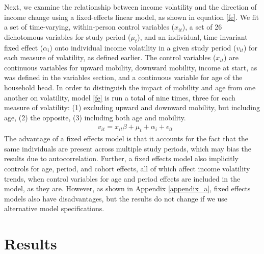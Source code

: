 \documentclass[12pt]{article}
\begin{document}
Next, we examine the relationship between income volatility and the direction of income change using a fixed-effects linear model, as shown in equation \ref{fe}. We fit a set of time-varying, within-person control variables ($x_{it}$), a set of 26 dichotomous variables for study period ($\mu_{t}$), and an individual, time invariant fixed effect ($\alpha_{i}$) onto individual income volatility in a given study period ($v_{it}$) for each measure of volatility, as defined earlier. The control variables ($x_{it}$) are continuous variables for upward mobility, downward mobility, income at start, as was defined in the variables section, and a continuous variable for age of the household head.  In order to distinguish the impact of mobility and age from one another on volatility, model \ref{fe} is run a total of nine times, three for each measure of volatility: (1) excluding upward and downward mobility, but including age, (2) the opposite, (3) including both age and mobility.
\begin{align}
& v_{it} = x_{it}\beta + \mu_{t} + \alpha_{i} + \epsilon_{it}
\label{fe}
\end{align}
The advantage of a fixed effects model is that it accounts for the fact that the same individuals are present across multiple study periods, which may bias the results due to autocorrelation. Further, a fixed effects model also implicitly controls for age, period, and cohort effects, all of which affect income volatility trends, when control variables for age and period effects are included in the model, as they are. However, as shown in Appendix \ref{appendix_a}, fixed effects models also have disadvantages, but the results do not change if we use alternative model specifications.

\section{Results}
\end{document}
